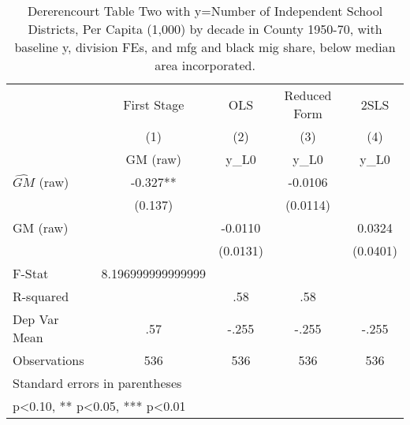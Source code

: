 \begin{table}[htbp]\centering
\def\sym#1{\ifmmode^{#1}\else\(^{#1}\)\fi}
\caption{Dererencourt Table Two with y=Number of Independent School Districts, Per Capita (1,000) by decade in County 1950-70, with baseline y, division FEs, and mfg and black mig share, below median area incorporated.}
\begin{tabular}{l*{4}{c}}
\toprule
                    & First Stage   &         OLS   &Reduced Form   &        2SLS   \\
                    &\multicolumn{1}{c}{(1)}&\multicolumn{1}{c}{(2)}&\multicolumn{1}{c}{(3)}&\multicolumn{1}{c}{(4)}\\
                    &\multicolumn{1}{c}{GM  (raw)}&\multicolumn{1}{c}{y\_L0}&\multicolumn{1}{c}{y\_L0}&\multicolumn{1}{c}{y\_L0}\\
\midrule
$\hat{GM}$ (raw)    &      -0.327** &               &     -0.0106   &               \\
                    &     (0.137)   &               &    (0.0114)   &               \\
\addlinespace
GM  (raw)           &               &     -0.0110   &               &      0.0324   \\
                    &               &    (0.0131)   &               &    (0.0401)   \\
\midrule
F-Stat              &8.196999999999999   &               &               &               \\
R-squared           &               &         .58   &         .58   &               \\
Dep Var Mean        &         .57   &       -.255   &       -.255   &       -.255   \\
Observations        &         536   &         536   &         536   &         536   \\
\bottomrule
\multicolumn{5}{l}{\footnotesize Standard errors in parentheses}\\
\multicolumn{5}{l}{\footnotesize * p<0.10, ** p<0.05, *** p<0.01}\\
\end{tabular}
\end{table}
